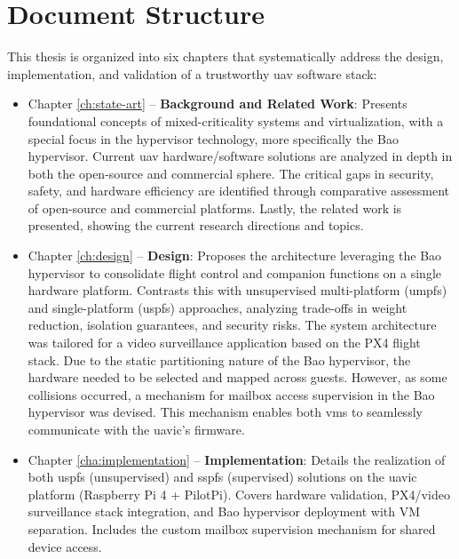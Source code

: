 \section{Document Structure}
\label{sec:doc-structure}
This thesis is organized into six chapters that systematically address the
design, implementation, and validation of a trustworthy \gls{uav} software
stack:

\begin{itemize}
\item
  Chapter \ref{ch:state-art} -- \textbf{Background and Related Work}:
Presents foundational concepts of mixed-criticality systems and virtualization,
with a special focus in the hypervisor technology, more specifically the Bao
hypervisor. Current
\gls{uav} hardware/software solutions are analyzed in depth in both the
open-source and commercial sphere. The critical gaps in security,
safety, and hardware efficiency are identified through comparative assessment of
open-source and commercial platforms. Lastly, the related work is presented, showing the current research directions and topics.

\item 
Chapter \ref{ch:design} -- \textbf{Design}:
Proposes the  architecture leveraging the Bao hypervisor to
consolidate flight control and companion functions on a single hardware
platform. Contrasts this with unsupervised multi-platform (\gls{umpfs}) and
single-platform (\gls{uspfs}) approaches, analyzing trade-offs in weight
reduction, isolation guarantees, and security risks. The system architecture was
tailored for a video surveillance application based on the PX4 flight stack. Due
to the static partitioning nature of the Bao hypervisor, the hardware needed to
be selected and mapped across guests. However, as some collisions occurred, a
mechanism for mailbox access supervision in the Bao hypervisor was devised. This
mechanism enables both \glspl{vm} to seamlessly communicate with the
\gls{uavic}'s firmware.

\item 
Chapter \ref{cha:implementation} -- \textbf{Implementation}:
Details the realization of both \gls{uspfs} (unsupervised) and \gls{sspfs}
(supervised) solutions on the \gls{uavic} platform (Raspberry Pi 4 +
PilotPi). Covers hardware validation, PX4/video surveillance stack integration,
and Bao hypervisor deployment with VM separation. Includes the custom mailbox
supervision mechanism for shared device access.


\end{itemize}

